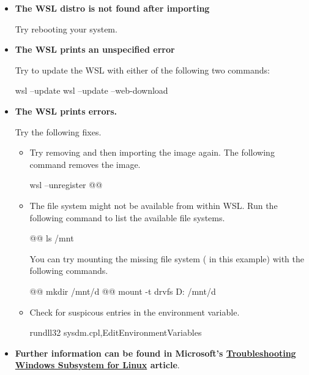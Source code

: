 \begin{itemize}
  \item {\bf The WSL distro is not found after importing}

    Try rebooting your system.
  \item {\bf The WSL prints an unspecified error}

    Try to update the WSL with either of the following two commands:
  \begin{monobox}
wsl --update
wsl --update --web-download
\end{monobox}
  \item {\bf The WSL prints  errors.}

    Try the following fixes.
    \begin{itemize}
      \item Try removing and then importing the image again.
        The following command removes the image.
        \begin{monobox}
wsl --unregister @\imagename{}@
\end{monobox}
      \item The file system might not be available from within WSL.
        Run the following command to list the available file systems.
        \begin{monobox}
@\cmdinwsl{}@ ls /mnt
\end{monobox}
        You can try mounting the missing file system ( in this example) with the following commands.
        \begin{monobox}
@\cmdinwsl{}@ mkdir /mnt/d
@\cmdinwsl{}@ mount -t drvfs D: /mnt/d
\end{monobox}
      \item Check for suspicous entries in the  environment variable.
        \begin{monobox}
rundll32 sysdm.cpl,EditEnvironmentVariables
\end{monobox}
    \end{itemize}
    \item {\bf Further information can be found in Microsoft's \href{https://learn.microsoft.com/en-us/windows/wsl/troubleshooting}{Troubleshooting Windows Subsystem for Linux} article}.
\end{itemize}

